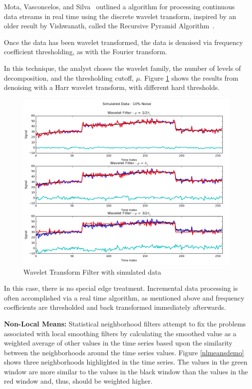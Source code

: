 \documentclass[11pt]{article}
\newcommand{\vs}{\vspace{0.1in}}
\theoremstyle{definition}
\begin{document}
Mota, Vasconcelos, and Silva~\cite{Mota05} outlined a algorithm for processing continuous data streams in real time using the discrete wavelet transform, inspired by an older result by Vishwanath, called the Recursive Pyramid Algorithm~\cite{Vishwanath94}.

Once the data has been wavelet transformed, the data is denoised via frequency coefficient thresholding, as with the Fourier transform.

In this technique, the analyst choses the wavelet family, the number of levels of decomposition, and the thresholding cutoff, $\mu$. Figure \ref{waveletcompare} shows the results from denoising with a Harr wavelet transform, with different hard thresholds.

\begin{figure}
\centering
\includegraphics[width = 0.65 \textwidth]{WaveletCompare.png}
\caption{Wavelet Transform Filter with simulated data}
\label{waveletcompare}
\end{figure}

In this case, there is no special edge treatment. Incremental data processing is often accomplished via a real time algorithm, as mentioned above and frequency coefficients are thresholded and back transformed immediately afterwards.

\vs
\noindent
\textbf{Non-Local Means:} Statistical neighborhood filters attempt to fix the problems associated with local smoothing filters by calculating the smoothed value as a weighted average of other values in the time series based upon the similarity between the neighborhoods around the time series values. Figure \ref{nlmeansdemo} shows three neighborhoods highlighted in the time series. The values in the green window are more similar to the values in the black window than the values in the red window and, thus, should be weighted higher.
\end{document}
